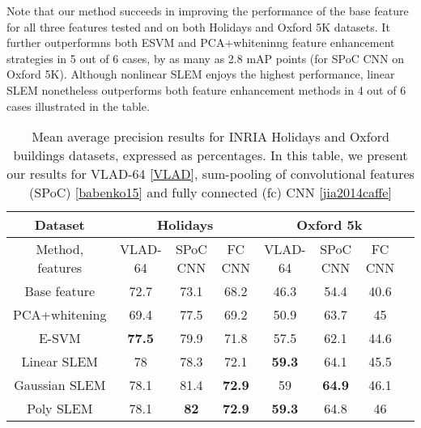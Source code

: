 Note that our method succeeds in improving the performance of the base feature for all three features tested and on both Holidays and Oxford 5K datasets. It further outperformns both ESVM and PCA+whiteninng feature enhancement strategies in 5 out of 6 cases, by as many as 2.8 mAP points (for SPoC CNN on Oxford 5K). Although nonlinear SLEM enjoys the highest performance, linear SLEM nonetheless outperforms both feature enhancement methods in 4 out of 6 cases illustrated in the table.


\begin{table*}[t]
\begin{center}
\caption{Mean average precision results for INRIA Holidays and Oxford buildings datasets, expressed as percentages. In this table, we present our results for VLAD-64 \ref{VLAD}, sum-pooling of convolutional features (SPoC) \ref{babenko15} and fully connected (fc) CNN \ref{jia2014caffe}}
\begin{tabular}{|c|c|c|c|c|c|c|c|}
\hline
Dataset & \multicolumn{3}{|c|}{\textbf{Holidays}} & \multicolumn{3}{|c|}{\textbf{Oxford 5k}}\\
\hline
Method, features & VLAD-64  & SPoC CNN & FC CNN & VLAD-64 & SPoC CNN & FC CNN\\
\hline\hline
Base feature            & 72.7         & 73.1         & 68.2         & 46.3           & 54.4         & 40.6\\
PCA+whitening       & 69.4         & 77.5         & 69.2         & 50.9           & 63.7         & 45 \\
E-SVM               & \textbf{77.5} & 79.9         & 71.8         & 57.5           & 62.1         & 44.6\\
Linear SLEM         & 78           & 78.3         & 72.1         & \textbf{59.3}   & 64.1         & 45.5\\
Gaussian SLEM       & 78.1         & 81.4         & \textbf{72.9} & 59             & \textbf{64.9} & 46.1\\
Poly SLEM           & 78.1         & \textbf{82}   & \textbf{72.9} & \textbf{59.3}  & 64.8         & 46\\
\hline
\end{tabular}
\end{center}
\label{fullrank:results}
\end{table*}

